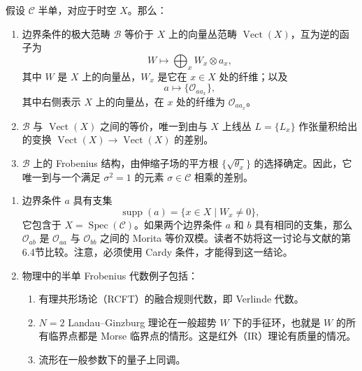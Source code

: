 \begin{theorem}\label{thm:2.8}
假设 $\mathcal{C}$ 半单，对应于时空 $X$。那么：
\begin{enumerate}[label=(\roman*)]
\item 边界条件的极大范畴 $\mathcal{B}$ 等价于 $X$ 上的向量丛范畴 $\operatorname{Vect}(X)$，互为逆的函子为
\begin{equation}\label{eq:2.40}
W\longmapsto\bigoplus_xW_x\otimes a_x,
\end{equation}
其中 $W$ 是 $X$ 上的向量丛，$W_x$ 是它在 $x\in X$ 处的纤维；以及
\begin{equation}\label{eq:2.41}
a\longmapsto\{\mathcal{O}_{aa_x}\},
\end{equation}
其中右侧表示 $X$ 上的向量丛，在 $x$ 处的纤维为 $\mathcal{O}_{aa_x}$。
\item $\mathcal{B}$ 与 $\operatorname{Vect}(X)$ 之间的等价，唯一到由与 $X$ 上线丛 $L=\{L_x\}$ 作张量积给出的变换 $\operatorname{Vect}(X)\to\operatorname{Vect}(X)$ 的差别。
\item $\mathcal{B}$ 上的 Frobenius 结构，由伸缩子场的平方根 $\{\sqrt{\theta_x}\}$ 的选择确定。因此，它唯一到与一个满足 $\sigma^2=1$ 的元素 $\sigma\in\mathcal{C}$ 相乘的差别。
\end{enumerate}
\end{theorem}

\begin{note}[2.9]\label{note:2.9}
\begin{enumerate}[label=(\arabic*)]
\item 边界条件 $a$ 具有支集
\begin{equation}\label{eq:2.42}
\operatorname{supp}(a)=\{x\in X\mid W_x\neq0\},
\end{equation}
它包含于 $X=\operatorname{Spec}(\mathcal{C})$。如果两个边界条件 $a$ 和 $b$ 具有相同的支集，那么 $\mathcal{O}_{ab}$ 是 $\mathcal{O}_{aa}$ 与 $\mathcal{O}_{bb}$ 之间的 Morita 等价双模。读者不妨将这一讨论与文献的第6.4节比较。注意，必须使用 Cardy 条件，才能得到这一结论。
\item 物理中的半单 Frobenius 代数例子包括：
\begin{enumerate}[label=(\alph*)]
\item 有理共形场论（RCFT）的融合规则代数，即 Verlinde 代数。
\item $N=2$ Landau--Ginzburg 理论在一般超势 $W$ 下的手征环，也就是 $W$ 的所有临界点都是 Morse 临界点的情形。这是红外（IR）理论有质量的情况。
\item 流形在一般参数下的量子上同调。
\end{enumerate}
\end{enumerate}
\end{note}

